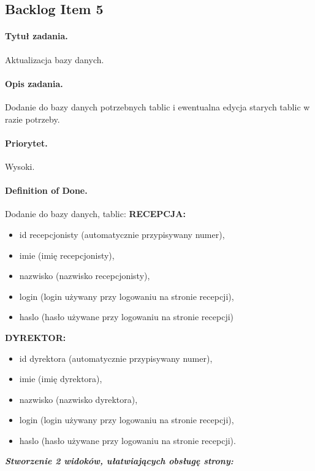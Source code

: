 \documentclass[a4paper]{article} \usepackage{polski} \usepackage[cp1250]{inputenc} \usepackage{url}
\begin{document}
\subsection{Backlog Item 5}\paragraph{Tytuł zadania.} Aktualizacja bazy danych. \paragraph{Opis zadania.} Dodanie do bazy danych potrzebnych tablic i ewentualna edycja starych tablic w razie potrzeby. \paragraph{Priorytet.} Wysoki. \paragraph{Definition of Done.} Dodanie do bazy danych, tablic:
\newline
\newline
 \textbf{RECEPCJA:}
 \begin{itemize}
\item id recepcjonisty  (automatycznie przypisywany numer),
\item imie (imię recepcjonisty),
\item nazwisko (nazwisko recepcjonisty),
\item login (login używany przy logowaniu na stronie recepcji),
\item  haslo (hasło używane przy logowaniu na stronie recepcji)
\end {itemize}
\newline
\textbf{DYREKTOR:}
\begin {itemize}
\item id dyrektora  (automatycznie przypisywany numer),
\item imie (imię dyrektora),
\item nazwisko (nazwisko dyrektora),
\item login (login używany przy logowaniu na stronie recepcji),
\item haslo (hasło używane przy logowaniu na stronie recepcji).
\end {itemize}
\newline
\textit{\textbf{Stworzenie 2 widoków, ułatwiających obsługę strony:}}
\newline
 
\end{document}
